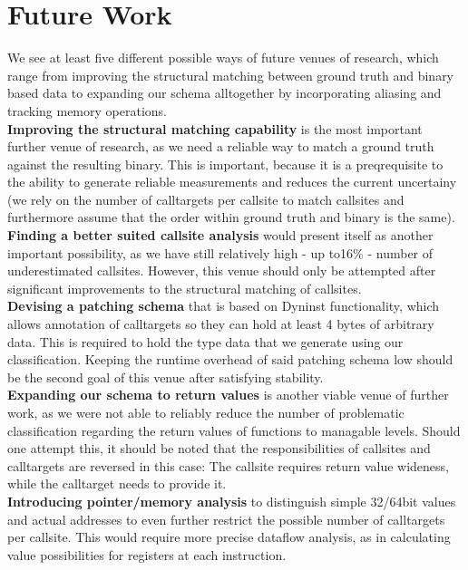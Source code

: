 \chapter{Future Work}
\label{chapter:Future_Work}
We see at least five different possible ways of future venues of research, which range from improving the structural matching between ground truth and binary based data to expanding our schema alltogether by incorporating aliasing and tracking memory operations.\\

\textbf{Improving the structural matching capability} is the most important further venue of research, as we need a reliable way to match a ground truth against the resulting binary. This is important, because it is a preqrequisite to the ability to generate reliable measurements and reduces the current uncertainy (we rely on the number of calltargets per callsite to match callsites and furthermore assume that the order within ground truth and binary is the same).\\

\textbf{Finding a better suited callsite analysis} would present itself as another important possibility, as we have still relatively high - up to16\% - number of underestimated callsites. However, this venue should only be attempted after significant improvements to the structural matching of callsites.\\

\textbf{Devising a patching schema} that is based on Dyninst functionality, which allows annotation of calltargets so they can hold at least 4 bytes of arbitrary data. This is required to hold the type data that we generate using our classification. Keeping the runtime overhead of said patching schema low should be the second goal of this venue after satisfying stability.\\

\textbf{Expanding our schema to return values} is another viable venue of further work, as we were not able to reliably reduce the number of problematic classification regarding the return values of functions to managable levels. Should one attempt this, it should be noted that the responsibilities of callsites and calltargets are reversed in this case: The callsite requires return value wideness, while the calltarget needs to provide it.\\

\textbf{Introducing pointer/memory analysis} to distinguish simple 32/64bit values and actual addresses to even further restrict the possible number of calltargets per callsite. This would require more precise dataflow analysis, as in calculating value possibilities for registers at each instruction.
